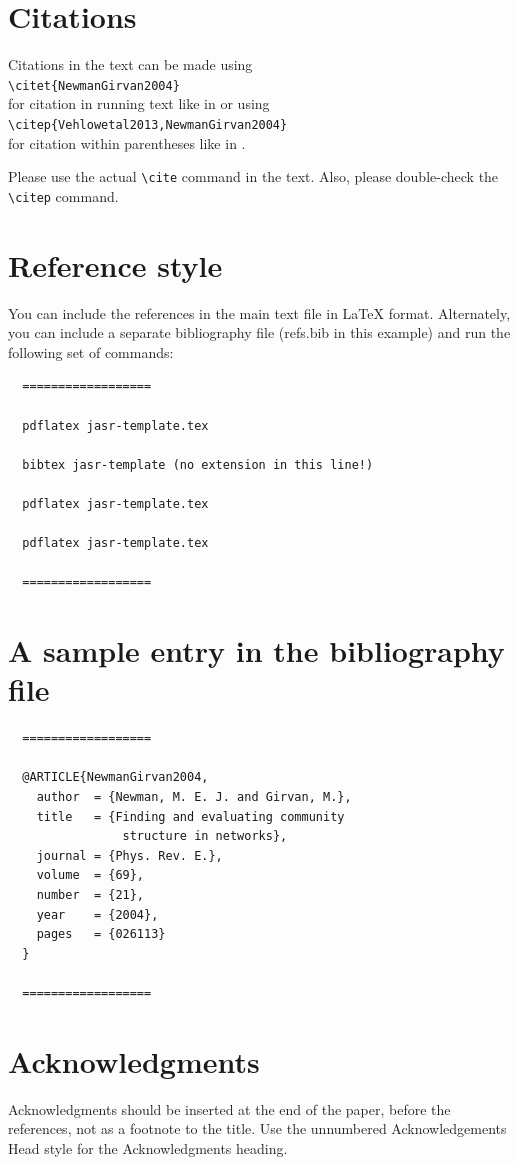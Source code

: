 \documentclass[times,authoryear]{elsarticle}
\begin{document}
\section{Citations}

Citations in the text can be made using\\[6pt]
\verb+\citet{NewmanGirvan2004}+\\[6pt]
for citation in running text like in
\citet{NewmanGirvan2004} or using\\[6pt]
\verb+\citep{Vehlowetal2013,NewmanGirvan2004}+\\[6pt]
for citation within parentheses like in
\citep{Vehlowetal2013,NewmanGirvan2004}.

Please use the actual \verb+\cite+ command in the text.
Also, please double-check the \verb+\citep+ command.

\section{Reference style}
You can include the references in the main text file in \LaTeX
format. Alternately, you can include a separate bibliography
file (refs.bib in this example) and run the following set of
commands:
\begin{verbatim}
  ==================

  pdflatex jasr-template.tex

  bibtex jasr-template (no extension in this line!)

  pdflatex jasr-template.tex

  pdflatex jasr-template.tex

  ==================
  \end{verbatim}

\section{A sample entry in the bibliography file}
\begin{verbatim}
  ==================

  @ARTICLE{NewmanGirvan2004,
    author  = {Newman, M. E. J. and Girvan, M.},
    title   = {Finding and evaluating community 
                structure in networks},
    journal = {Phys. Rev. E.},
    volume  = {69},
    number  = {21},
    year    = {2004},
    pages   = {026113}
  }

  ==================
  \end{verbatim}

\section*{Acknowledgments}
Acknowledgments should be inserted at the end of the paper,
before the references, not as a footnote to the title. Use the
unnumbered Acknowledgements Head style for the Acknowledgments
heading.



\end{document}
